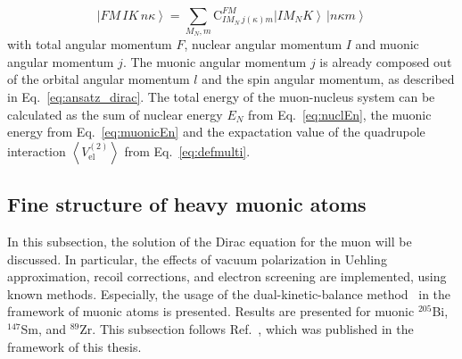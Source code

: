 \begin{equation}
\label{eq:totalState}
\left| FM\,IK\,n\kappa\right> = \sum_{M_N, m}\text{C}^{FM}_{IM_N\,j(\kappa)m}\left|IM_NK\right>\,\left|n\kappa m\right>
\end{equation}
with total angular momentum $F$, nuclear angular momentum $I$ and muonic angular momentum $j$. The muonic angular momentum $j$ is already composed out of the orbital angular momentum $l$ and the spin angular momentum, as described in Eq.~\eqref{eq:ansatz_dirac}. The total energy of the muon-nucleus system can be calculated as the sum of nuclear energy $E_N$ from Eq.~\eqref{eq:nuclEn}, the muonic energy from Eq.~\eqref{eq:muonicEn} and the expactation value of the quadrupole interaction $\left<V_{\text{el}}^{(2)}\right>$ from Eq.~\eqref{eq:defmulti}.

\subsection{Fine structure of heavy muonic atoms}
\label{sec:muon_finestructure}
In this subsection, the solution of the Dirac equation for the muon will be discussed. In particular, the effects of vacuum polarization in Uehling approximation, recoil corrections, and electron screening are implemented, using known methods. Especially, the usage of the dual-kinetic-balance method~\cite{Shabaev2004} in the framework of muonic atoms is presented. Results are presented for muonic $^{205}$Bi, $^{147}$Sm, and $^{89}$Zr. This subsection follows Ref.~\cite{michel2017}, which was published in the framework of this thesis. 

